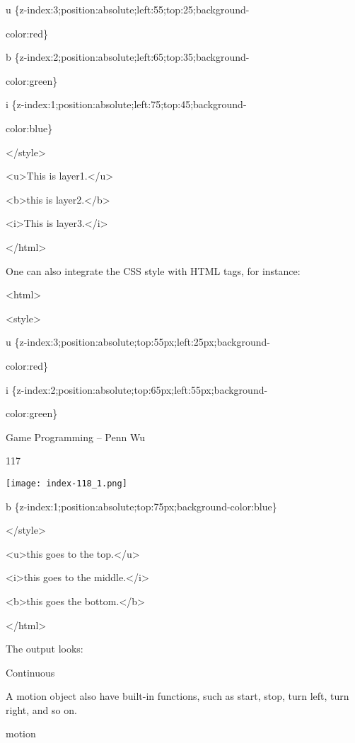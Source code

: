 \documentclass[
]{article}
\begin{document}
u \{z-index:3;position:absolute;left:55;top:25;background-

color:red\}

b \{z-index:2;position:absolute;left:65;top:35;background-

color:green\}

i \{z-index:1;position:absolute;left:75;top:45;background-

color:blue\}

\textless/style\textgreater{}

\textless u\textgreater This is layer1.\textless/u\textgreater{}

\textless b\textgreater this is layer2.\textless/b\textgreater{}

\textless i\textgreater This is layer3.\textless/i\textgreater{}

\textless/html\textgreater{}

One can also integrate the CSS style with HTML tags, for instance:

\textless html\textgreater{}

\textless style\textgreater{}

u \{z-index:3;position:absolute;top:55px;left:25px;background-

color:red\}

i \{z-index:2;position:absolute;top:65px;left:55px;background-

color:green\}

Game Programming -- Penn Wu

117

\protect\hypertarget{index_split_008.htmlux5cux23p118}{}{}\texttt{[image: index-118\_1.png]}

b \{z-index:1;position:absolute;top:75px;background-color:blue\}

\textless/style\textgreater{}

\textless u\textgreater this goes to the top.\textless/u\textgreater{}

\textless i\textgreater this goes to the
middle.\textless/i\textgreater{}

\textless b\textgreater this goes the bottom.\textless/b\textgreater{}

\textless/html\textgreater{}

The output looks:

Continuous

A motion object also have built-in functions, such as start, stop, turn
left, turn right, and so on.

motion
\end{document}
